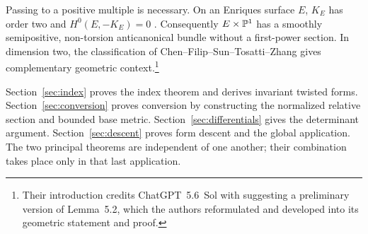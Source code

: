 Passing to a positive multiple is necessary. On an Enriques surface
\(E\), \(K_E\) has order two and \(H^0(E,-K_E)=0\)
\cite{Dolgachev2016}. Consequently \(E\times\mathbb P^1\) has a smoothly
semipositive, non-torsion anticanonical bundle without a first-power
section. In dimension two, the classification of
Chen--Filip--Sun--Tosatti--Zhang
\cite[Theorem~1.3]{CFSTZ2026} gives complementary geometric
context.\footnote{Their introduction credits ChatGPT~5.6~Sol with
suggesting a preliminary version of Lemma~5.2, which the authors
reformulated and developed into its geometric statement and proof.}

Section~\ref{sec:index} proves the index theorem and derives invariant
twisted forms. Section~\ref{sec:conversion} proves conversion by
constructing the normalized relative section and bounded base metric.
Section~\ref{sec:differentials} gives the determinant argument.
Section~\ref{sec:descent} proves form descent and the global application.
The two principal theorems are independent of one another; their
combination takes place only in that last application.
